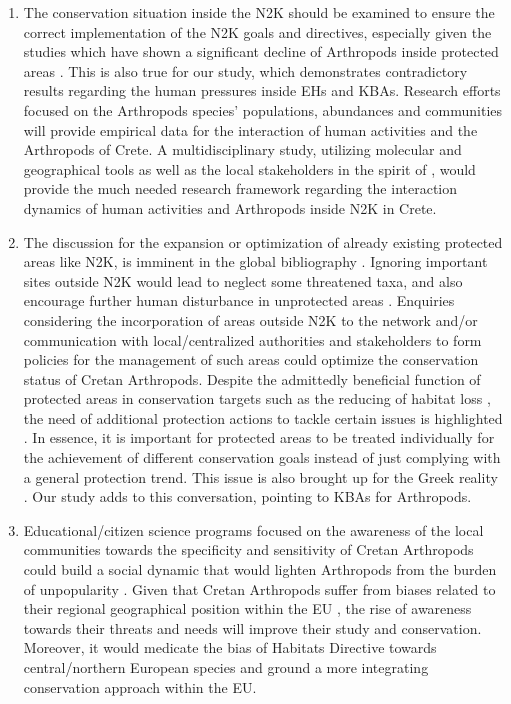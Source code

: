 \begin{enumerate}

    \item The conservation situation inside the N2K should be examined to ensure the
correct implementation of the N2K goals and directives, especially given the
studies which have shown a significant decline of Arthropods inside protected
areas \parencite{chowdhury2023protected,hallmann2017more}. This is also true for our
study, which demonstrates contradictory results regarding the human pressures
inside EHs and KBAs. Research efforts focused on the Arthropods species’
populations, abundances and communities will provide empirical data for the
interaction of human activities and the Arthropods of Crete. A multidisciplinary
study, utilizing molecular and geographical tools as well as the local
stakeholders in the spirit of \textcite{lehmann2021diversity}, would provide the much
needed research framework regarding the interaction dynamics of human activities
and Arthropods inside N2K in Crete.

    \item The discussion for the expansion or optimization of already existing
protected areas like N2K, is imminent in the global bibliography \parencite{chowdhury2023three-quarters}.
Ignoring important sites outside N2K would lead to neglect some threatened taxa,
and also encourage further human disturbance in unprotected areas \parencite{borges2005ranking}.
Enquiries considering the incorporation of areas outside N2K to the network
and/or communication with local/centralized authorities and stakeholders to
form policies for the management of such areas could optimize the conservation
status of Cretan Arthropods. Despite the admittedly beneficial function of
protected areas in conservation targets such as the reducing of habitat loss \parencite{geldmann2013effectiveness},
the need of additional protection actions to tackle certain issues is highlighted \parencite{damen2013protected,hochkirch2013europe}.
In essence, it is important for protected areas to be treated individually for
the achievement of different conservation goals instead of just complying with
a general protection trend. This issue is also brought up for the Greek reality \parencite{dimitrakopoulos2004questioning,kougioumoutzis2020plant,kougioumoutzis2021plant}.
Our study adds to this conversation, pointing to KBAs for Arthropods.

    \item Educational/citizen science programs focused on the awareness of the local
communities towards the specificity and sensitivity of Cretan Arthropods could
build a social dynamic that would lighten Arthropods from the burden of
unpopularity \parencite{wang2021out-of-sight}. Given that Cretan Arthropods suffer from
biases related to their regional geographical position within the EU \parencite{cardoso2012habitats},
the rise of awareness towards their threats and needs will improve their study
and conservation. Moreover, it would medicate the bias of Habitats Directive
towards central/northern European species and ground a more integrating
conservation approach within the EU.


\end{enumerate}
